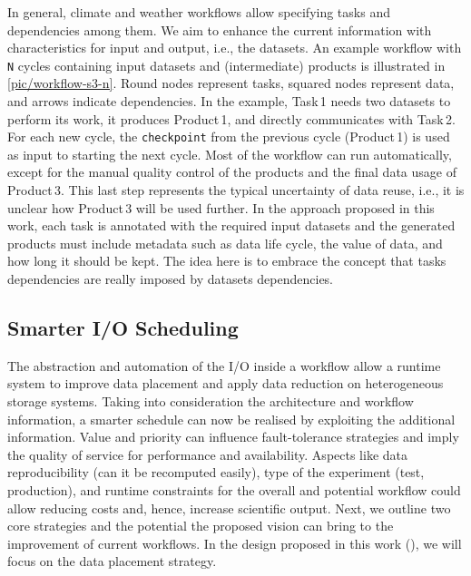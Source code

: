 \documentclass{superfri}
\begin{document}
In general, climate and weather workflows allow specifying tasks and dependencies among them.
We aim to enhance the current information with characteristics for input and output, i.e., the datasets.
An example workflow with \texttt{N} cycles containing input datasets and (intermediate) products is illustrated in \cref{pic/workflow-s3-n}.
Round nodes represent tasks, squared nodes represent data, and arrows indicate dependencies.
In the example, Task\,1 needs two datasets to perform its work, it produces Product\,1, and directly communicates with Task\,2.
For each new cycle, the \texttt{checkpoint} from the previous cycle (Product\,1) is used as input to starting the next cycle.
Most of the workflow can run automatically, except for the manual quality control of the products and the final data usage of Product\,3.
This last step represents the typical uncertainty of data reuse, i.e., it is unclear how Product\,3 will be used further.
In the approach proposed in this work, each task is annotated with the required input datasets and the generated products must include metadata such as data life cycle, the value of data, and how long it should be kept.
The idea here is to embrace the concept that tasks dependencies are really imposed by datasets dependencies.


\subsection{Smarter I/O Scheduling}

The abstraction and automation of the I/O inside a workflow allow a runtime system to improve data placement and apply data reduction on heterogeneous storage systems.
Taking into consideration the architecture and workflow information, a smarter schedule can now be realised by exploiting the additional information.
Value and priority can influence fault-tolerance strategies and imply the quality of service for performance and availability.
Aspects like data reproducibility (can it be recomputed easily), type of the experiment (test, production), and runtime constraints for the overall and potential workflow could allow reducing costs and, hence, increase scientific output.
Next, we outline two core strategies and the potential the proposed vision can bring to the improvement of current workflows.
In the design proposed in this work (), we will focus on the data placement strategy.
\end{document}
